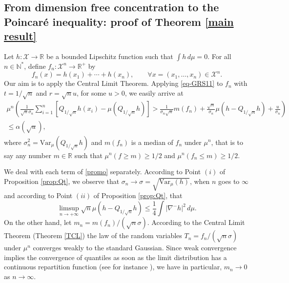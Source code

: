 \documentclass[11pt]{amsart}
\numberwithin{equation}{section}
\begin{document}
\subsection{From dimension free concentration to the Poincar\'e inequality: proof of Theorem \ref{main result}}
Let $h:{\mathcal{X}} \to {\mathbb{R}}$ be a bounded Lipschitz function such that $\int h\,d\mu=0.$
For all $n\in {\mathbb{N}}^*$, define $f_n:{\mathcal{X}}^n\to {\mathbb{R}}^+$ by 
\[
f_n(x)=h(x_1)+\cdots+h(x_n),\qquad \forall x=(x_1,\ldots,x_n)\in {\mathcal{X}}^n.
\]
Our aim is to apply the Central Limit 
Theorem.
Applying \eqref{eq-GRS11} to $f_n$ with $t=1/\sqrt{n}$ and $r=\sqrt{n}u$, for some $u>0$, we easily arrive at
\begin{multline}\label{promo}
\mu^{n} \left( \frac{1}{\sqrt{n}\sigma_n}\sum_{i=1}^n \left[Q_{1/\sqrt{n}} h(x_i) -\mu (Q_{1/\sqrt{n}}h)\right] > \frac{1}{\sigma_n\sqrt{n}}m(f_n)+\frac{\sqrt{n}}{\sigma_n} \mu \left(h-Q_{1/\sqrt{n}}h \right) + \frac{u}{\sigma_n} \right)\\
\leq \alpha (\sqrt{u}),\end{multline}
where $\sigma_n^2 = \mathrm{Var}_{\mu} (Q_{1/\sqrt{n}} h)$ and $m(f_n)$ is a median of $f_n$ under $\mu^n$, that is to say any number $m\in {\mathbb{R}}$ such that $\mu^n(f\geq m)\geq1/2$ and $\mu^n(f_n\leq m)\geq 1/2.$

We deal with each term of \eqref{promo} separately. 
According to Point $(i)$ of Proposition \ref{prop:Qt}, we observe that $\sigma_n \to \sigma=\sqrt{\mathrm{Var}_\mu (h)}$, when $n$ goes to $\infty$
and according to Point $(ii)$ of Proposition \ref{prop:Qt}, that
\[
\limsup_{n\to +\infty}\sqrt{n}\mu \left(h-Q_{1/\sqrt{n}}h \right) \leq\frac{1}{4}\int |\nabla^- h|^2\,d\mu.
\]
On the other hand, let $m_n=m(f_n)/(\sqrt{n}\sigma)$. According to the Central Limit Theorem (Theorem \ref{TCL}) the law of the random variables $T_n=f_n/(\sqrt{n}\sigma)$ under $\mu^n$ converges weakly to the standard Gaussian. Since weak convergence implies the convergence of quantiles as soon as the limit distribution has a continuous repartition function (see for instance \cite[Lemma 21.2]{vdv98}), we have in particular, $m_n \to 0$ as $n\to\infty$.
\end{document}
